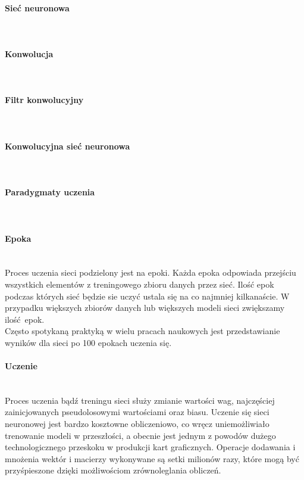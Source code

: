 \paragraph{Sieć neuronowa} \mbox{}\\

\paragraph{Konwolucja} \mbox{}\\

\paragraph{Filtr konwolucyjny} \mbox{}\\

\paragraph{Konwolucyjna sieć neuronowa} \mbox{}\\

\paragraph{Paradygmaty uczenia} \mbox{}\\

\paragraph{Epoka} \mbox{}\\
Proces uczenia sieci podzielony jest na epoki. Każda epoka odpowiada przejściu
wszystkich elementów z treningowego zbioru danych przez sieć. Ilość epok podczas
których sieć będzie sie uczyć ustala się na co najmniej kilkanaście. W przypadku
większych zbiorów danych lub większych modeli sieci zwiększamy ilość epok. \\
Często spotykaną praktyką w wielu pracach naukowych jest przedstawianie wyników
dla sieci po 100 epokach uczenia się.

\paragraph{Uczenie} \mbox{}\\
Proces uczenia bądź treningu sieci służy zmianie wartości wag, najczęściej zainicjowanych
pseudolosowymi wartościami oraz biasu. Uczenie się sieci neuronowej jest bardzo
kosztowne obliczeniowo, co wręcz uniemożliwiało trenowanie modeli w przeszłości,
a obecnie jest jednym z powodów dużego technologicznego przeskoku w produkcji kart
graficznych. Operacje dodawania i mnożenia wektór i macierzy wykonywane są setki
milionów razy, które mogą być przyśpieszone dzięki możliwościom zrównoleglania obliczeń. \\

